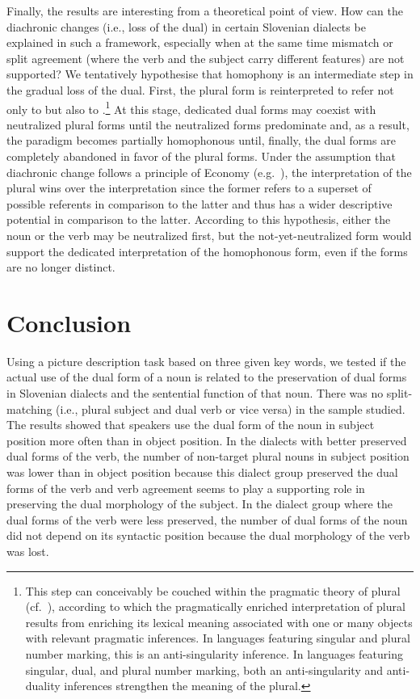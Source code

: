 \documentclass[output=paper,colorlinks,citecolor=brown]{langscibook}
\begin{document}
Finally, the results are interesting from a theoretical point of view. How can the diachronic changes (i.e., loss of the dual) in certain Slovenian dialects be explained in such a framework, especially when at the same time mismatch or split agreement (where the verb and the subject carry different features) are not supported? We tentatively hypothesise that homophony is an intermediate step in the gradual loss of the dual. First, the plural form is reinterpreted to refer not only to  but also to .\footnote{This step can conceivably be couched within the pragmatic theory of plural (cf.\ \citealt{Sauerland2008,Spector2007}), according to which the pragmatically enriched interpretation of plural  results from enriching its lexical meaning associated with one or many objects with relevant pragmatic inferences. In languages featuring singular and plural number marking, this is an anti-singularity inference. In languages featuring singular, dual, and plural number marking, both an anti-singularity and anti-duality inferences strengthen the meaning of the plural.} At this stage, dedicated dual forms may coexist with neutralized plural forms until the neutralized forms predominate and, as a result, the paradigm becomes partially homophonous until, finally, the dual forms are completely abandoned in favor of the plural forms. Under the assumption that diachronic change follows a principle of Economy (e.g.\ \citealt{Martinet1955}), the  interpretation of the plural wins over the  interpretation since the former refers to a superset of possible referents in comparison to the latter and thus has a wider descriptive potential in comparison to the latter. According to this hypothesis, either the noun or the verb may be neutralized first, but the not-yet-neutralized form would support the dedicated interpretation of the homophonous form, even if the forms are no longer distinct.

\section{Conclusion}\label{pav:sec:conclusion}
Using a picture description task based on three given key words, we tested if the actual use of the dual form of a noun is related to the preservation of dual forms in Slovenian dialects and the sentential function of that noun. There was no split-matching (i.e., plural subject and dual verb or vice versa) in the sample studied. The results showed that speakers use the dual form of the noun in subject position more often than in object position. In the dialects with better preserved dual forms of the verb, the number of non-target plural nouns in subject position was lower than in object position because this dialect group preserved the dual forms of the verb and verb agreement seems to play a supporting role in preserving the dual morphology of the subject. In the dialect group where the dual forms of the verb were less preserved, the number of dual forms of the noun did not depend on its syntactic position because the dual morphology of the verb was lost.
\end{document}
